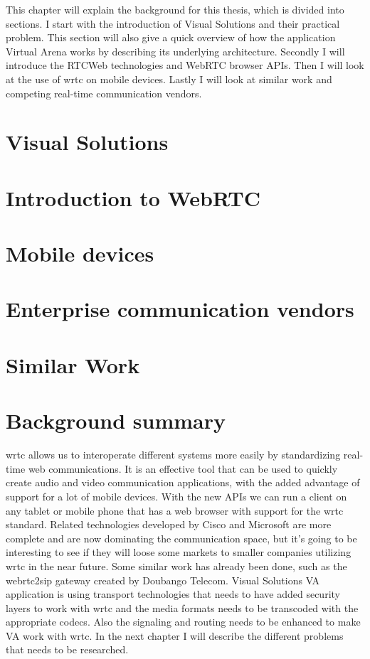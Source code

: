 
This chapter will explain the background for this thesis, which is divided into sections. I start with the introduction of Visual Solutions and their practical problem. This section will also give a quick overview of how the application Virtual Arena works by describing its underlying architecture. Secondly I will introduce the RTCWeb technologies and WebRTC browser APIs. Then I will look at the use of \gls{wrtc} on mobile devices. Lastly I will look at similar work and competing real-time communication vendors.

\section{Visual Solutions}


\newpage
\section{Introduction to WebRTC}


\newpage
\section{Mobile devices}


\newpage
\section{Enterprise communication vendors}


\newpage
\section{Similar Work}


\newpage
\section{Background summary}
\gls{wrtc} allows us to interoperate different systems more easily by standardizing real-time web communications. It is an effective tool that can be used to quickly create audio and video communication applications, with the added advantage of support for a lot of mobile devices. With the new APIs we can run a client on any tablet or mobile phone that has a web browser with support for the \gls{wrtc} standard. Related technologies developed by Cisco and Microsoft are more complete and are now dominating the communication space, but it's going to be interesting to see if they will loose some markets to smaller companies utilizing \gls{wrtc} in the near future. Some similar work has already been done, such as the webrtc2sip gateway created by Doubango Telecom. Visual Solutions VA application is using transport technologies that needs to have added security layers to work with \gls{wrtc} and the media formats needs to be transcoded with the appropriate codecs. Also the signaling and routing needs to be enhanced to make VA work with \gls{wrtc}. In the next chapter I will describe the different problems that needs to be researched.

